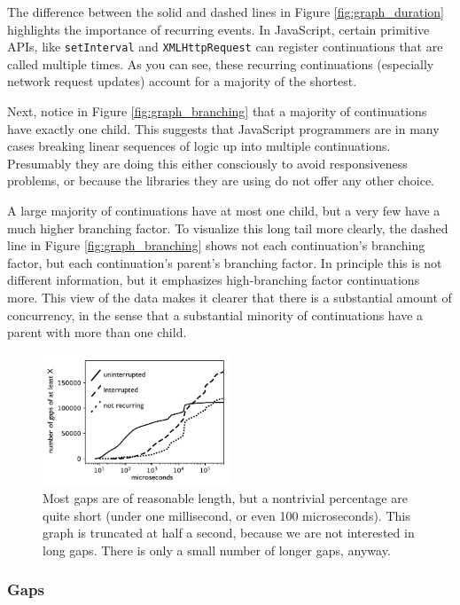 \documentclass[sigplan,10pt,review,anonymous]{acmart}\settopmatter{printfolios=true,printccs=false,printacmref=false}
\begin{document}
The difference between the solid and dashed lines in Figure \ref{fig:graph_duration} highlights the importance of recurring events.
In JavaScript, certain primitive APIs, like \texttt{setInterval} and \texttt{XMLHttpRequest} can register continuations that are called multiple times.
As you can see, these recurring continuations (especially network request updates) account for a majority of the shortest.

Next, notice in Figure \ref{fig:graph_branching} that a majority of continuations have exactly one child.
This suggests that JavaScript programmers are in many cases breaking linear sequences of logic up into multiple continuations.
Presumably they are doing this either consciously to avoid responsiveness problems, or because the libraries they are using do not offer any other choice.

A large majority of continuations have at most one child, but a very few have a much higher branching factor.
To visualize this long tail more clearly, the dashed line in Figure \ref{fig:graph_branching} shows not each continuation's branching factor, but each continuation's parent's branching factor.
In principle this is not different information, but it emphasizes high-branching factor continuations more.
This view of the data makes it clearer that there is a substantial amount of concurrency, in the sense that a substantial minority of continuations have a parent with more than one child.

\begin{figure}
\hspace*{-0.2cm}\includegraphics[width=0.5\textwidth]{gaps_graph_bw}
\caption{Most gaps are of reasonable length, but a nontrivial percentage are quite short (under one millisecond, or even 100 microseconds).
  This graph is truncated at half a second, because we are not interested in long gaps.
  There is only a small number of longer gaps, anyway.}
\label{fig:graph_gaps}
\end{figure}

\subsubsection{Gaps}
\end{document}
